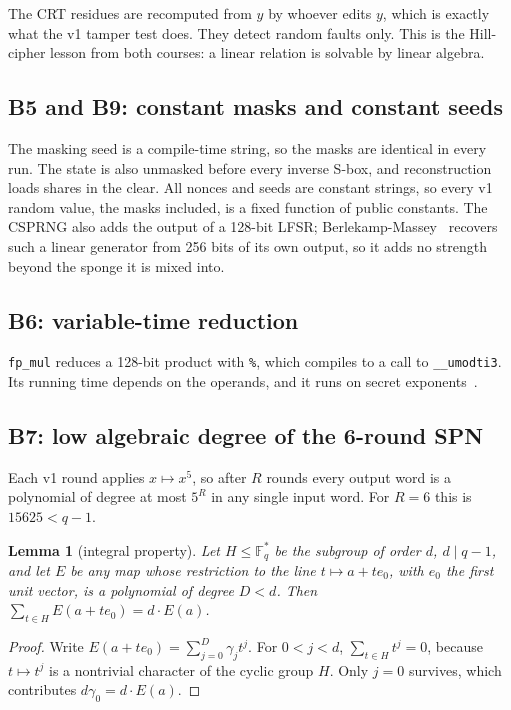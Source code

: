 \documentclass[10pt,a4paper]{article}
\newcommand{\Fq}{\mathbb{F}_q}
\newcommand{\code}[1]{\texttt{#1}}
\newtheorem{lemma}[theorem]{Lemma}
\theoremstyle{definition}
\theoremstyle{remark}
\begin{document}
The CRT residues are recomputed from $y$ by whoever edits $y$, which is exactly what the v1 tamper test does. They detect random faults only. This is the Hill-cipher lesson from both courses: a linear relation is solvable by linear algebra.

\subsection{B5 and B9: constant masks and constant seeds}
The masking seed is a compile-time string, so the masks are identical in every run. The state is also unmasked before every inverse S-box, and reconstruction loads shares in the clear. All nonces and seeds are constant strings, so every v1 random value, the masks included, is a fixed function of public constants. The CSPRNG also adds the output of a 128-bit LFSR; Berlekamp-Massey~\cite{massey} recovers such a linear generator from 256 bits of its own output, so it adds no strength beyond the sponge it is mixed into.

\subsection{B6: variable-time reduction}
\code{fp\_mul} reduces a 128-bit product with \code{\%}, which compiles to a call to \code{\_\_umodti3}. Its running time depends on the operands, and it runs on secret exponents~\cite{kocher}.

\subsection{B7: low algebraic degree of the 6-round SPN}
Each v1 round applies $x \mapsto x^5$, so after $R$ rounds every output word is a polynomial of degree at most $5^R$ in any single input word. For $R = 6$ this is $15625 < q-1$.

\begin{lemma}[integral property]\label{lem:integral}
Let $H \le \Fq^*$ be the subgroup of order $d$, $d \mid q-1$, and let $E$ be any map whose restriction to the line $t \mapsto a + t e_0$, with $e_0$ the first unit vector, is a polynomial of degree $D < d$. Then $\sum_{t \in H} E(a + t e_0) = d \cdot E(a)$.
\end{lemma}
\begin{proof}
Write $E(a + t e_0) = \sum_{j=0}^{D} \gamma_j t^j$. For $0 < j < d$, $\sum_{t\in H} t^j = 0$, because $t \mapsto t^j$ is a nontrivial character of the cyclic group $H$. Only $j = 0$ survives, which contributes $d\gamma_0 = d \cdot E(a)$.
\end{proof}
\end{document}
